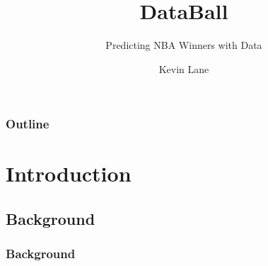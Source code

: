 \documentclass{beamer}
\title{DataBall}
\subtitle{Predicting NBA Winners with Data}
\author{Kevin Lane}
\begin{document}
\begin{frame}
\titlepage
\end{frame}

\begin{frame}
\frametitle{Outline}
\tableofcontents
\end{frame}

\section{Introduction}
\subsection{Background}

\begin{frame}
\frametitle{Background}
\end{frame}
\end{document}
